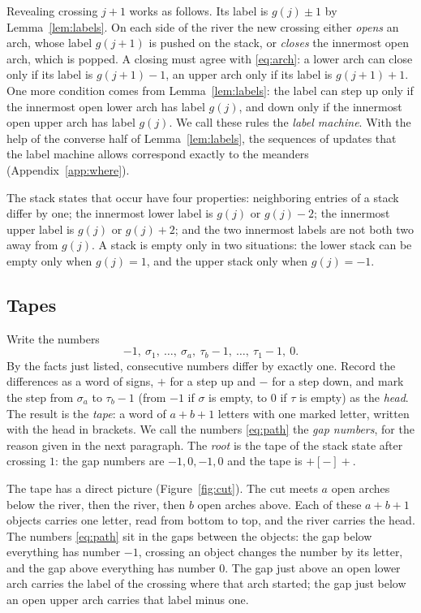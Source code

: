 Revealing crossing $j+1$ works as follows. Its label is $g(j)\pm1$ by Lemma~\ref{lem:labels}. On each side of the
river the new crossing either \emph{opens} an arch, whose label $g(j+1)$ is pushed on the stack, or \emph{closes} the
innermost open arch, which is popped. A closing must agree with \eqref{eq:arch}: a lower arch can close only if its
label is $g(j+1)-1$, an upper arch only if its label is $g(j+1)+1$. One more condition comes from
Lemma~\ref{lem:labels}: the label can step up only if the innermost open lower arch has label $g(j)$, and down only if
the innermost open upper arch has label $g(j)$. We call these rules the \emph{label machine}. With the help of the
converse half of Lemma~\ref{lem:labels}, the sequences of updates that the label machine allows correspond exactly to
the meanders (Appendix~\ref{app:where}).

The stack states that occur have four properties: neighboring entries of a stack differ by one; the innermost lower
label is $g(j)$ or $g(j)-2$; the innermost upper label is $g(j)$ or $g(j)+2$; and the two innermost labels are not
both two away from $g(j)$. A stack is empty only in two situations: the lower stack can be empty only when $g(j)=1$,
and the upper stack only when $g(j)=-1$.


\subsection{Tapes}

Write the numbers
\begin{equation}\label{eq:path}
  -1,\ \sigma_1,\ \ldots,\ \sigma_a,\ \tau_b-1,\ \ldots,\ \tau_1-1,\ 0 .
\end{equation}
By the facts just listed, consecutive numbers differ by exactly one. Record the differences as a word of signs, $+$ for
a step up and $-$ for a step down, and mark the step from $\sigma_a$ to $\tau_b-1$ (from $-1$ if $\sigma$ is empty, to
$0$ if $\tau$ is empty) as the \emph{head}. The result is the \emph{tape}: a word of $a+b+1$ letters with one marked
letter, written with the head in brackets. We call the numbers \eqref{eq:path} the \emph{gap numbers}, for the
reason given in the next paragraph. The \emph{root} is the tape of the stack state after crossing $1$: the gap numbers
are $-1,0,-1,0$ and the tape is $+[-]+$.

The tape has a direct picture (Figure~\ref{fig:cut}). The cut meets $a$ open arches below the river, then the river,
then $b$ open arches above. Each of these $a+b+1$ objects carries one letter, read from bottom to top, and the river
carries the head. The numbers \eqref{eq:path} sit in the gaps between the objects: the gap below everything has number
$-1$, crossing an object changes the number by its letter, and the gap above everything has number $0$. The gap just
above an open lower arch carries the label of the crossing where that arch started; the gap just below an open upper
arch carries that label minus one.

